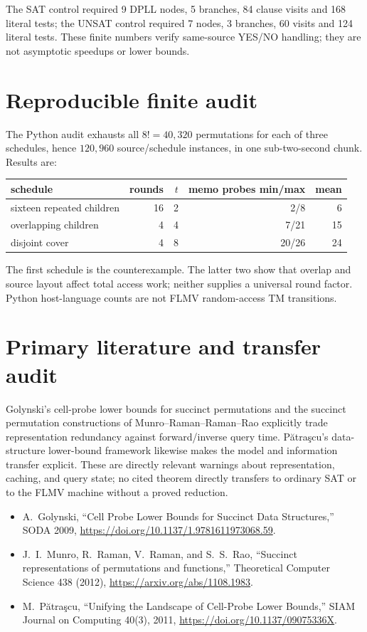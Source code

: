 \documentclass[11pt]{article}
\begin{document}
The SAT control required 9 DPLL nodes, 5 branches, 84 clause visits and 168
literal tests; the UNSAT control required 7 nodes, 3 branches, 60 visits and 124
literal tests.  These finite numbers verify same-source YES/NO handling; they are
not asymptotic speedups or lower bounds.

\section{Reproducible finite audit}
The Python audit exhausts all $8!=40{,}320$ permutations for each of three
schedules, hence $120{,}960$ source/schedule instances, in one sub-two-second
chunk.  Results are:
\begin{center}
\begin{tabular}{lrrrr}
\toprule
schedule & rounds & $t$ & memo probes min/max & mean\\
\midrule
sixteen repeated children & 16 & 2 & 2/8 & 6\\
overlapping children & 4 & 4 & 7/21 & 15\\
disjoint cover & 4 & 8 & 20/26 & 24\\
\bottomrule
\end{tabular}
\end{center}
The first schedule is the counterexample.  The latter two show that overlap and
source layout affect total access work; neither supplies a universal round
factor.  Python host-language counts are not FLMV random-access TM transitions.

\section{Primary literature and transfer audit}
Golynski's cell-probe lower bounds for succinct permutations and the succinct
permutation constructions of Munro--Raman--Raman--Rao explicitly trade
representation redundancy against forward/inverse query time.  P\u{a}tra\c{s}cu's
data-structure lower-bound framework likewise makes the model and information
transfer explicit.  These are directly relevant warnings about representation,
caching, and query state; no cited theorem directly transfers to ordinary SAT or
to the FLMV machine without a proved reduction.
\begin{itemize}
\item A.~Golynski, ``Cell Probe Lower Bounds for Succinct Data Structures,''
SODA 2009, \url{https://doi.org/10.1137/1.9781611973068.59}.
\item J.~I.~Munro, R.~Raman, V.~Raman, and S.~S.~Rao, ``Succinct representations
of permutations and functions,'' Theoretical Computer Science 438 (2012),
\url{https://arxiv.org/abs/1108.1983}.
\item M.~P\u{a}tra\c{s}cu, ``Unifying the Landscape of Cell-Probe Lower Bounds,''
SIAM Journal on Computing 40(3), 2011,
\url{https://doi.org/10.1137/09075336X}.
\end{itemize}
\end{document}
